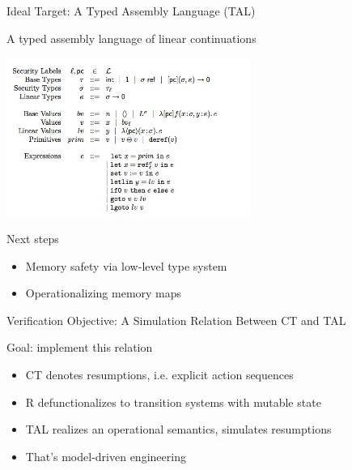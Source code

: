 \documentclass{beamer}
\begin{document}
\begin{frame}{Ideal Target: A Typed Assembly Language (TAL)}

\begin{structure}{A typed assembly language of linear continuations \cite{Zdancewic_Meyers_2002}}

\includegraphics[width=8cm]{zd_syntax.jpg}

\end{structure}

\begin{structure}{Next steps}

\begin{itemize}
\item{Memory safety via low-level type system}
\item{Operationalizing memory maps}
\end{itemize}

\end{structure}


\end{frame}




\begin{frame}{Verification Objective: A Simulation Relation Between CT and TAL}


\begin{structure}{Goal: implement this relation}


\begin{itemize}

\item{CT denotes resumptions, i.e. explicit action sequences}
\item{R defunctionalizes to transition systems with mutable state}
\item{TAL realizes an operational semantics, simulates resumptions}
\item{That's model-driven engineering}

\end{itemize}

\end{structure}

\end{frame}
\end{document}
